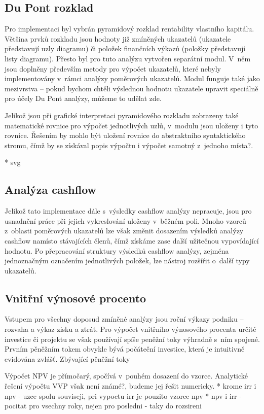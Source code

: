 \subsection{Du Pont rozklad}
Pro implementaci byl vybrán pyramidový rozklad rentability vlastního kapitálu. Většina prvků rozkladu jsou hodnoty již zmíněných ukazatelů (ukazatele představují uzly diagramu) či položek finančních výkazů (položky představují listy diagramu). Přesto byl pro tuto analýzu vytvořen separátní modul. V~něm jsou doplněny především metody pro výpočet ukazatelů, které nebyly implementovány v~rámci analýzy poměrových ukazatelů. Modul funguje také jako mezivrstva -- pokud bychom chtěli výslednou hodnotu ukazatele upravit speciálně pro účely Du Pont analýzy, můžeme to udělat zde. 

Jelikož jsou při grafické interpretaci pyramidového rozkladu zobrazeny také matematické rovnice pro výpočet jednotlivých uzlů, v~modulu jsou uloženy i tyto rovnice. Řešením by mohlo být uložení rovnice do abstraktního syntaktického stromu, čímž by se získával popis výpočtu i výpočet samotný z~jednoho místa?.

* svg

\subsection{Analýza cashflow}
Jelikož tato implementace dále s~výsledky cashflow analýzy nepracuje, jsou pro usnadnění práce při jejich vykreslování uloženy v~běžném poli. Mnoho vzorců z~oblasti poměrových ukazatelů lze však změnit dosazením výsledků analýzy cashflow namísto stávajících členů, čímž získáme zase další užitečnou vypovídající hodnotu. Po přepracování struktury výsledků cashflow analýzy, zejména jednoznačným označením jednotlivých položek, lze nástroj rozšířit o~další typy ukazatelů. 

\subsection{Vnitřní výnosové procento}
\label{irr}
Vstupem pro všechny doposud zmíněné analýzy jsou roční výkazy podniku -- rozvaha a výkaz zisku a ztrát. Pro výpočet vnitřního výnosového procenta určité investice či projektu se však používají spíše peněžní toky výhradně s~ním spojené. Prvním pěněžním tokem obvykle bývá počáteční investice, která je intuitivně evidována zvlášť. Zbývající pěněžní toky 

Výpočet NPV je přímočarý, spočívá v~pouhém dosazení do vzorce. Analytické řešení výpočtu VVP však není známé?, budeme jej řešit numericky. 
* krome irr i npv - uzce spolu souviseji, pri vypoctu irr je pouzito vzorce npv
* npv i irr - pocitat pro vsechny roky, nejen pro posledni - taky do rozsireni

